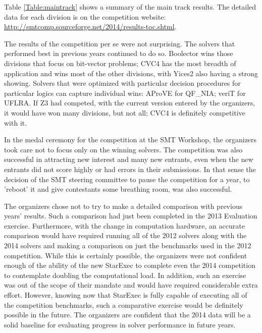\documentclass[twoside,11pt]{article}
\begin{document}
Table \ref{Table:maintrack} shows a summary of the main track results. The detailed data for each division is on the competition website: \url{http://smtcomp.sourceforge.net/2014/results-toc.shtml}.

The results of the competition per se were not surprising. The solvers that performed best in previous years continued to do so. Boolector wins those divisions that focus on bit-vector problems; CVC4 has the most breadth of application and wins most of the other divisions, with Yices2 also having a strong showing. Solvers that were optimized with particular decision procedures for particular logics can capture individual wins: AProVE for QF\_NIA; veriT for UFLRA. If Z3 had competed, with the current version entered by the organizers, it would have won many divisions, but not all; CVC4 is 
definitely competitive with it. 

In the medal ceremony for the competition at the SMT Workshop, the organizers took care not to focus only on the winning solvers. The competition was also successful in attracting new interest and many new entrants, even when the new entrants did not score highly or had errors in their submissions. In that sense the decision of the SMT steering committee to pause
the competition for a year, to 'reboot' it and give contestants some breathing room, was also successful.

The organizers chose not to try to make a detailed comparison with previous years' results. Such a comparison had just been
completed in the 2013 Evaluation exercise. Furthermore, with the change in computation hardware, an accurate comparison
would have required running all of the 2012 solvers along with the 2014 solvers and making a comparison on just the
benchmarks used in the 2012 competition. While this is certainly possible, the organizers were not confident enough of the
ability of the new StarExec to complete even the 2014 competition to contemplate doubling the computational load.
In addition, such an exercise was out of the scope of their mandate and would have required considerable extra effort.
However, knowing now that StarExec is fully capable of executing all of the competition benchmarks, such a
comparative exercise would be definitely possible in the future.
The organizers are confident that the 2014 data will be a solid baseline for evaluating progress in solver performance in future years.
\end{document}
